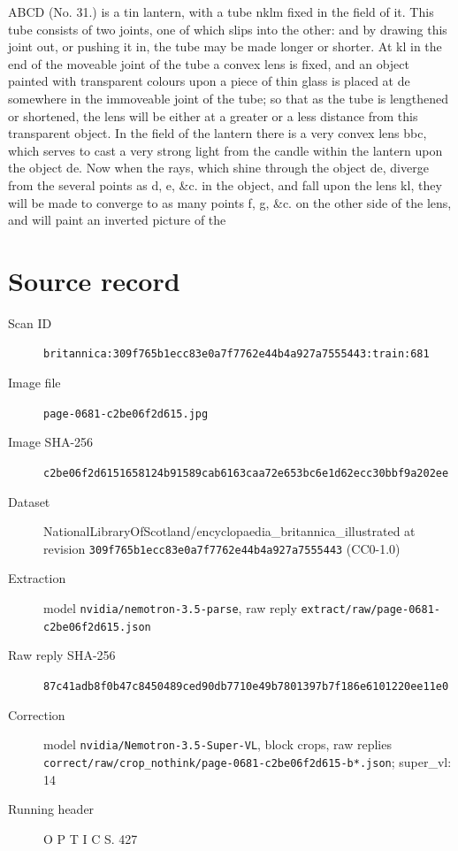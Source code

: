 \documentclass{article}
\begin{document}
ABCD (No. 31.) is a tin lantern, with a tube nklm fixed in the field of it. This tube consists of two joints, one of which slips into the other: and by drawing this joint out, or pushing it in, the tube may be made longer or shorter. At kl in the end of the moveable joint of the tube a convex lens is fixed, and an object painted with transparent colours upon a piece of thin glass is placed at de somewhere in the immoveable joint of the tube; so that as the tube is lengthened or shortened, the lens will be either at a greater or a less distance from this transparent object. In the field of the lantern there is a very convex lens bbc, which serves to cast a very strong light from the candle within the lantern upon the object de. Now when the rays, which shine through the object de, diverge from the several points as d, e, \&c. in the object, and fall upon the lens kl, they will be made to converge to as many points f, g, \&c. on the other side of the lens, and will paint an inverted picture of the


\section*{Source record}
\begin{description}
\item[Scan ID] \texttt{britannica:309f765b1ecc83e0a7f7762e44b4a927a7555443:train:681}
\item[Image file] \texttt{page-0681-c2be06f2d615.jpg}
\item[Image SHA-256] \texttt{c2be06f2d6151658124b91589cab6163caa72e653bc6e1d62ecc30bbf9a202ee}
\item[Dataset] NationalLibraryOfScotland/encyclopaedia\_britannica\_illustrated at revision \texttt{309f765b1ecc83e0a7f7762e44b4a927a7555443} (CC0-1.0)
\item[Extraction] model \texttt{nvidia/nemotron-3.5-parse}, raw reply \texttt{extract/raw/page-0681-c2be06f2d615.json}
\item[Raw reply SHA-256] \texttt{87c41adb8f0b47c8450489ced90db7710e49b7801397b7f186e6101220ee11e0}
\item[Correction] model \texttt{nvidia/Nemotron-3.5-Super-VL}, block crops, raw replies \texttt{correct/raw/crop\_nothink/page-0681-c2be06f2d615-b*.json}; super\_vl: 14
\item[Running header] O P T I C S. 427
\end{description}
\end{document}
